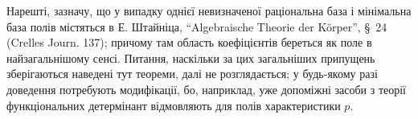\documentclass[11pt]{article}
\begin{document}
Нарешті, зазначу, що у випадку однієї невизначеної раціональна база і мінімальна база полів містяться в Е. Штайніца, ``Algebraische Theorie der Körper'', \S\ 24 (Crelles Journ. 137); причому там область коефіцієнтів береться як поле в найзагальнішому сенсі. Питання, наскільки за цих загальніших припущень зберігаються наведені тут теореми, далі не розглядається; у будь-якому разі доведення потребують модифікації, бо, наприклад, уже допоміжні засоби з теорії функціональних детермінант відмовляють для полів характеристики $p$.
\end{document}
